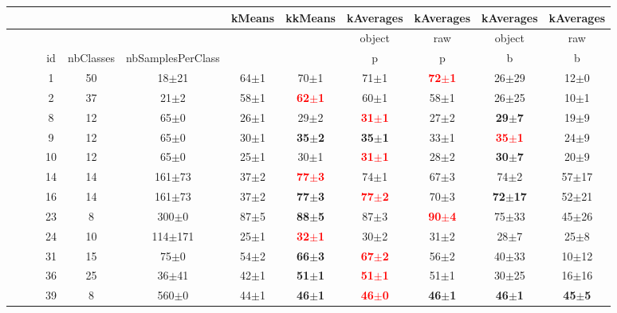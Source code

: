 \documentclass[12pt,a4paper,fleqn]{tufte-handout}
\begin{document}
  
\begin{table} 
\begin{center} 
\small 
 \setlength{\tabcolsep}{.16667em} 
\begin{tabular}{lllccccccccc} 
 &  &  &  &  &  & kMeans & kkMeans & kAverages & kAverages & kAverages & kAverages \\ 
\hline 
 &  &  &  &  &  &  &  & object & raw & object & raw \\ 
 &  &  & id & nbClasses & nbSamplesPerClass &  &  & p & p & b & b \\ 
 &  &  &  1 & 50 &   18$\pm$21 &  64$\pm$1 &  70$\pm$1 &  71$\pm$1 & \textbf{\textcolor{red}{ 72$\pm$1}} & 26$\pm$29 &  12$\pm$0 \\ 
 &  &  &  2 & 37 &    21$\pm$2 &  58$\pm$1 & \textbf{\textcolor{red}{ 62$\pm$1}} &  60$\pm$1 &  58$\pm$1 & 26$\pm$25 &  10$\pm$1 \\ 
 &  &  &  8 & 12 &    65$\pm$0 & 26$\pm$1 & 29$\pm$2 & \textbf{\textcolor{red}{31$\pm$1}} & 27$\pm$2 & \textbf{29$\pm$7} & 19$\pm$9 \\ 
 &  &  &  9 & 12 &    65$\pm$0 & 30$\pm$1 & \textbf{35$\pm$2} & \textbf{35$\pm$1} & 33$\pm$1 & \textbf{\textcolor{red}{35$\pm$1}} & 24$\pm$9 \\ 
 &  &  & 10 & 12 &    65$\pm$0 & 25$\pm$1 & 30$\pm$1 & \textbf{\textcolor{red}{31$\pm$1}} & 28$\pm$2 & \textbf{30$\pm$7} & 20$\pm$9 \\ 
 &  &  & 14 & 14 &  161$\pm$73 &  37$\pm$2 & \textbf{\textcolor{red}{ 77$\pm$3}} &  74$\pm$1 &  67$\pm$3 &  74$\pm$2 & 57$\pm$17 \\ 
 &  &  & 16 & 14 &  161$\pm$73 &  37$\pm$2 & \textbf{ 77$\pm$3} & \textbf{\textcolor{red}{ 77$\pm$2}} &  70$\pm$3 & \textbf{72$\pm$17} & 52$\pm$21 \\ 
 &  &  & 23 &  8 &   300$\pm$0 &  87$\pm$5 & \textbf{ 88$\pm$5} &  87$\pm$3 & \textbf{\textcolor{red}{ 90$\pm$4}} & 75$\pm$33 & 45$\pm$26 \\ 
 &  &  & 24 & 10 & 114$\pm$171 & 25$\pm$1 & \textbf{\textcolor{red}{32$\pm$1}} & 30$\pm$2 & 31$\pm$2 & 28$\pm$7 & 25$\pm$8 \\ 
 &  &  & 31 & 15 &    75$\pm$0 &  54$\pm$2 & \textbf{ 66$\pm$3} & \textbf{\textcolor{red}{ 67$\pm$2}} &  56$\pm$2 & 40$\pm$33 & 10$\pm$12 \\ 
 &  &  & 36 & 25 &   36$\pm$41 &  42$\pm$1 & \textbf{ 51$\pm$1} & \textbf{\textcolor{red}{ 51$\pm$1}} &  51$\pm$1 & 30$\pm$25 & 16$\pm$16 \\ 
 &  &  & 39 &  8 &   560$\pm$0 & 44$\pm$1 & \textbf{46$\pm$1} & \textbf{\textcolor{red}{46$\pm$0}} & \textbf{46$\pm$1} & \textbf{46$\pm$1} & \textbf{45$\pm$5} \\ 

\end{tabular}
\end{center}
\end{table}
\end{document}
